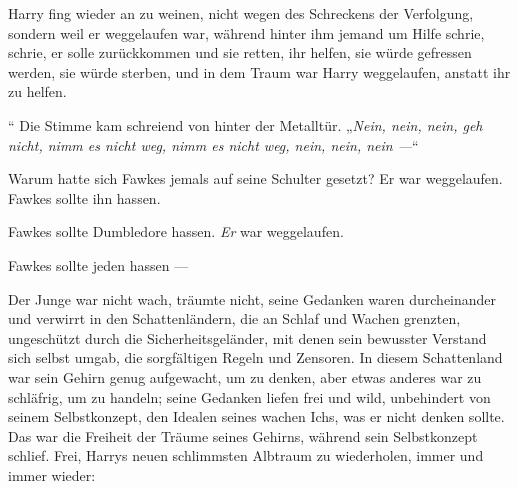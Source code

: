 Harry fing wieder an zu weinen, nicht wegen des Schreckens der Verfolgung, sondern weil er weggelaufen war, während hinter ihm jemand um Hilfe schrie, schrie, er solle zurückkommen und sie retten, ihr helfen, sie würde gefressen werden, sie würde sterben, und in dem Traum war Harry weggelaufen, anstatt ihr zu helfen.

“ Die Stimme kam schreiend von hinter der Metalltür. „\emph{Nein, nein, nein, geh nicht, nimm es nicht weg, nimm es nicht weg, nein, nein, nein —}“

Warum hatte sich Fawkes jemals auf seine Schulter gesetzt? Er war weggelaufen. Fawkes sollte ihn hassen.

Fawkes sollte Dumbledore hassen. \emph{Er} war weggelaufen.

Fawkes sollte jeden hassen —

Der Junge war nicht wach, träumte nicht, seine Gedanken waren durcheinander und verwirrt in den Schattenländern, die an Schlaf und Wachen grenzten, ungeschützt durch die Sicherheitsgeländer, mit denen sein bewusster Verstand sich selbst umgab, die sorgfältigen Regeln und Zensoren. In diesem Schattenland war sein Gehirn genug aufgewacht, um zu denken, aber etwas anderes war zu schläfrig, um zu handeln; seine Gedanken liefen frei und wild, unbehindert von seinem Selbstkonzept, den Idealen seines wachen Ichs, was er nicht denken sollte. Das war die Freiheit der Träume seines Gehirns, während sein Selbstkonzept schlief. Frei, Harrys neuen schlimmsten Albtraum zu wiederholen, immer und immer wieder:

